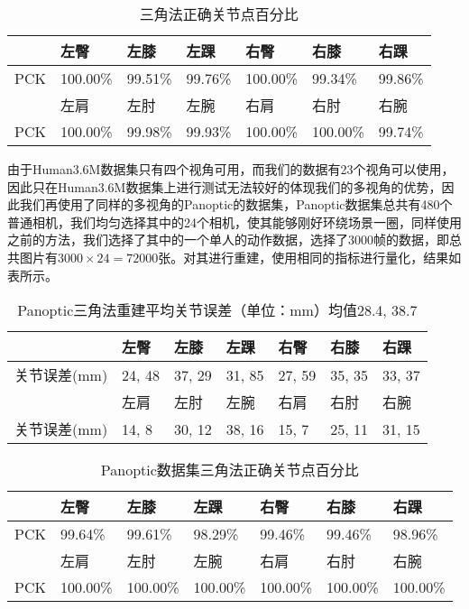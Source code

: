 \begin{table}[H]
    \centering
    \begin{tabular}{lllllll}
        \hline
            & 左臀     & 左膝    & 左踝    & 右臀     & 右膝     & 右踝    \\
        \hline
        PCK & 100.00\% & 99.51\% & 99.76\% & 100.00\% & 99.34\%  & 99.86\% \\
            & 左肩     & 左肘    & 左腕    & 右肩     & 右肘     & 右腕    \\
        PCK & 100.00\% & 99.98\% & 99.93\% & 100.00\% & 100.00\% & 99.74\% \\
        \hline
    \end{tabular}
    \caption{三角法正确关节点百分比\label{tab:3dpck}}
\end{table}

由于Human3.6M数据集只有四个视角可用，而我们的数据有23个视角可以使用，因此只在Human3.6M数据集上进行测试无法较好的体现我们的多视角的优势，因此我们再使用了同样的多视角的Panoptic的数据集，Panoptic数据集总共有480个普通相机，我们均匀选择其中的24个相机，使其能够刚好环绕场景一圈，同样使用之前的方法，我们选择了其中的一个单人的动作数据，选择了3000帧的数据，即总共图片有\(3000\times 24 = 72000\)张。对其进行重建，使用相同的指标进行量化，结果如表所示。

\begin{table}[H]
    \centering
    \begin{tabular}{lllllll}
        \hline
                     & 左臀   & 左膝   & 左踝   & 右臀   & 右膝   & 右踝   \\
        \hline
        关节误差(mm) & 24, 48 & 37, 29 & 31, 85 & 27, 59 & 35, 35 & 33, 37 \\
                     & 左肩   & 左肘   & 左腕   & 右肩   & 右肘   & 右腕   \\
        关节误差(mm) & 14, 8  & 30, 12 & 38, 16 & 15, 7  & 25, 11 & 31, 15 \\
        \hline
    \end{tabular}
    \caption{Panoptic三角法重建平均关节误差（单位：mm）均值28.4, 38.7\label{tab:3derrorcmu}}
\end{table}

\begin{table}[H]
    \centering
    \begin{tabular}{lllllll}
        \hline
             & 左臀    & 左膝    & 左踝    & 右臀    & 右膝    & 右踝    \\
        \hline
         PCK & 99.64\%  & 99.61\%  & 98.29\%  & 99.46\%  & 99.46\%  & 98.96\%  \\
             & 左肩    & 左肘    & 左腕    & 右肩    & 右肘    & 右腕    \\
         PCK & 100.00\% & 100.00\% & 100.00\% & 100.00\% & 100.00\% & 100.00\% \\
        \hline
        \end{tabular}
    \caption{Panoptic数据集三角法正确关节点百分比\label{tab:3dpckcmu}}
\end{table}

